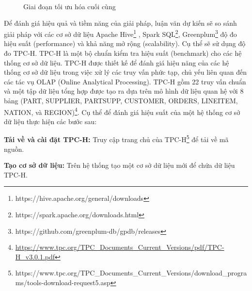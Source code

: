 \documentclass{article}[14pt]
\begin{document}
{\begin{figure}[htbp]
\centering
{}
\captionsetup{font=Large}
\caption{Giai đoạn tối ưu hóa cuối cùng \cite{arnold2019hrdbms}}
\label{fig:phase4}
\end{figure}




Để đánh giá hiệu quả và tiềm năng của giải pháp, luận văn dự kiến sẽ so sánh giải pháp với các cơ sở dữ liệu Apache Hive\footnote{https://hive.apache.org/general/downloads} , Spark SQL\footnote{https://spark.apache.org/downloads.html}, Greenplum\footnote{https://github.com/greenplum-db/gpdb/releases}  độ đo hiệu suất (performance) và khả năng mở rộng (scalability). Cụ thể sẽ sử dụng độ đo TPC-H. TPC-H là một bộ chuẩn kiểm tra hiệu suất (benchmark) cho các hệ thống cơ sở dữ liệu. TPC-H được thiết kế để đánh giá hiệu năng của các hệ thống cơ sở dữ liệu trong việc xử lý các truy vấn phức tạp, chủ yếu liên quan đến các tác vụ OLAP (Online Analytical Processing). TPC-H gồm 22 truy vấn chuẩn và một tập dữ liệu tổng hợp được tạo ra dựa trên mô hình dữ liệu quan hệ với 8 bảng (PART, SUPPLIER, PARTSUPP, CUSTOMER, ORDERS, LINEITEM, NATION, và REGION)\footnote{\url{https://www.tpc.org/TPC_Documents_Current_Versions/pdf/TPC-H_v3.0.1.pdf}}.
Cụ thể để đánh giá hiệu suất của một hệ thống cơ sở dữ liệu thực hiện các bước sau:

\textbf{Tải về và cài đặt TPC-H:} Truy cập trang chủ của TPC-H\footnote{https://www.tpc.org/TPC\_Documents\_Current\_Versions/download\_programs/tools-download-request5.asp} để tải về mã nguồn.

\textbf{Tạo cơ sở dữ liệu:} Trên hệ thống tạo một cơ sở dữ liệu mới để chứa dữ liệu TPC-H.

}
\end{document}
